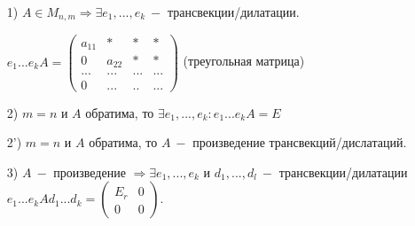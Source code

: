 \begin{theorem}
    \begin{enumerate}
        \item[]
        \item[1)] $A\in M_{n,m}\Rightarrow \exists e_1,...,e_k\ -$ 
трансвекции/дилатации.

        $e_1...e_kA=\begin{pmatrix}
            a_{11} & * & * & * \\ 0 & a_{22} & * & * \\ ...  & ... & ... & 
... \\ 0 & ... & .. & ...
        \end{pmatrix}$ (треугольная матрица)
        \item[2)] $m=n$ и $A$ обратима, то $\exists 
e_1,...,e_k:e_1...e_kA=E$ 
        \item[2')] $m=n$ и $A$ обратима, то $A\ -$ произведение 
трансвекций/дислатаций.
        \item[3)] $A\ -$ произведение $\Rightarrow \exists e_1,...,e_k$ и 
$d_1,...,d_l\ -$ трансвекции/дилатации 
$e_1...e_kAd_1...d_k=\left(\begin{array}{c|c}E_r & 0\\\hline 0 & 
0\end{array}\right)$.
    \end{enumerate}
\end{theorem}

